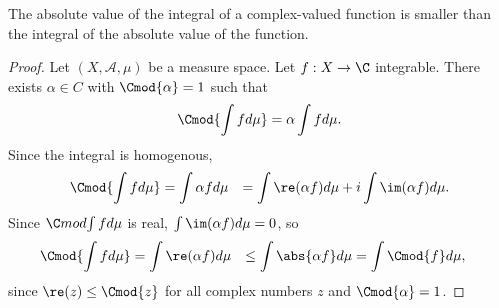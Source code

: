 \begin{proposition}
The absolute value of the integral of a complex-valued function is smaller than the integral of the absolute value of the function.
\begin{proof}Let $(X, \mathcal{A} , \mu )$ be a measure space.
Let $f: X \to \C $ integrable.
There exists $\alpha  \in C$ with $\Cmod{\alpha } = 1$ such that
\[
\Cmod{\int f d\mu } = \alpha  \int f d\mu .
\]
Since the integral is homogenous,
\[
\begin{aligned}
\Cmod{\int  f d\mu }
&= \int  \alpha  f d\mu
&= \int  \re(\alpha  f) d\mu  + i \int  \im(\alpha  f)d\mu .
\end{aligned}
\]
Since $\C mod{\int  f d\mu }$ is real, $\int  \im(\alpha  f) d\mu  = 0$, so
\[
\begin{aligned}
\Cmod{\int f d\mu }
&= \int  \re(\alpha  f) d\mu
&\leq \int  \abs{\alpha  f} d\mu
&= \int  \Cmod{f} d\mu ,
\end{aligned}
\]
since $\re(z) \leq \Cmod{z}$ for all complex numbers $z$ and $\Cmod{\alpha } = 1$.\end{proof}
\end{proposition}
